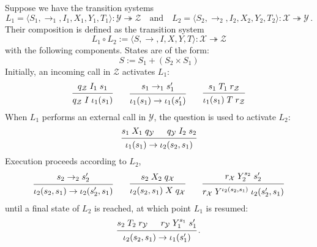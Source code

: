 \documentclass[acmsmall,review,anonymous]{acmart}\settopmatter{printfolios=true,printccs=false,printacmref=false}
\begin{document}
\begin{definition} %
Suppose we have the transition systems
\[
  L_1 = \langle S_1, {\rightarrow_1}, I_1, X_1, Y_1, T_1 \rangle
    : \mathcal{Y} \twoheadrightarrow \mathcal{Z}
  \quad \text{and} \quad
  L_2 = \langle S_2, {\rightarrow_2}, I_2, X_2, Y_2, T_2 \rangle
    : \mathcal{X} \twoheadrightarrow \mathcal{Y}
  \,.
\]
Their composition is defined as the transition system
\[
  L_1 \circ L_2 :=
  \langle S, {\rightarrow}, I, X, Y, T \rangle
  : \mathcal{X} \twoheadrightarrow \mathcal{Z}
\]
with the following components.
States are of the form:
\[
    S := S_1 + (S_2 \times S_1)
\]
Initially, an incoming call in $\mathcal{Z}$ activates $L_1$:
\[
  \begin{prooftree}
    \hypo{q_\mathcal{Z} \mathrel{I_1} s_1}
    \infer1{q_\mathcal{Z} \mathrel{I} \iota_1(s_1)}
  \end{prooftree}
  \qquad
  \begin{prooftree}
    \hypo{s_1 \rightarrow_1 s_1'}
    \infer1{\iota_1(s_1) \rightarrow \iota_1(s_1')}
  \end{prooftree}
  \qquad
  \begin{prooftree}
    \hypo{s_1 \mathrel{T_1} r_\mathcal{Z}}
    \infer1{\iota_1(s_1) \mathrel{T} r_\mathcal{Z}}
  \end{prooftree}
\]
When $L_1$ performs an external call in $\mathcal{Y}$,
the question is used to activate $L_2$:
\[
  \begin{prooftree}
    \hypo{s_1 \mathrel{X_1} q_\mathcal{Y}}
    \hypo{q_\mathcal{Y} \mathrel{I_2} s_2}
    \infer2{\iota_1(s_1) \rightarrow \iota_2(s_2, s_1)}
  \end{prooftree}
\]
Execution proceeds according to $L_2$,
\[
  \begin{prooftree}
    \hypo{s_2 \rightarrow_2 s_2'}
    \infer1{\iota_2(s_2, s_1) \rightarrow \iota_2(s_2', s_1)}
  \end{prooftree}
  \qquad
  \begin{prooftree}
    \hypo{s_2 \mathrel{X_2} q_\mathcal{X}}
    \infer1{\iota_2(s_2, s_1) \mathrel{X} q_\mathcal{X}}
  \end{prooftree}
  \qquad
  \begin{prooftree}
    \hypo{r_\mathcal{X} \mathrel{Y_2^{s_2}} s_2'}
    \infer1{r_\mathcal{X} \mathrel{Y^{\iota_2(s_2, s_1)}} \iota_2(s_2', s_1)}
  \end{prooftree}
\]
until a final state of $L_2$ is reached,
at which point $L_1$ is resumed:
\[
  \begin{prooftree}
    \hypo{s_2 \mathrel{T_2} r_\mathcal{Y}}
    \hypo{r_\mathcal{Y} \mathrel{Y_1^{s_1}} s_1'}
    \infer2{\iota_2(s_2, s_1) \rightarrow \iota_1(s_1')}
  \end{prooftree}
  \,.
\]
\end{definition}
\end{document}
